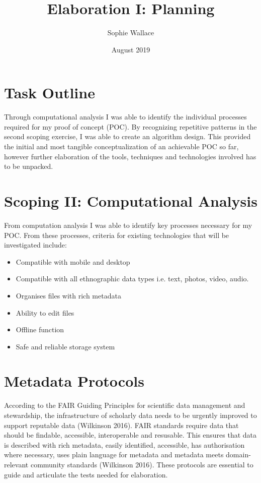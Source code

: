 \documentclass{article}
\title{Elaboration I: Planning}
\author{Sophie Wallace }
\date{August 2019}
\begin{document}
\maketitle

\section{Task Outline}
Through computational analysis I was able to identify the individual processes required for my proof of concept (POC). By recognizing repetitive patterns in the second scoping exercise, I was able to create an algorithm design. This provided the initial and most tangible conceptualization of an achievable POC so far, however further elaboration of the tools, techniques and technologies involved has to be unpacked.

\section{Scoping II: Computational Analysis}
From computation analysis I was able to identify key processes necessary for my POC. From these processes, criteria for existing technologies that will be investigated include:

\begin{itemize}
\item Compatible with mobile and desktop
\item Compatible with all ethnographic data types i.e. text, photos, video, audio.
\item Organises files with rich metadata
\item Ability to edit files
\item Offline function 
\item Safe and reliable storage system
\end{itemize}


\section{Metadata Protocols}
According to the FAIR Guiding Principles for scientific data management and stewardship, the infrastructure of scholarly data needs to be urgently improved to support reputable data (Wilkinson 2016). FAIR standards require data that should be findable, accessible, interoperable and resusable. This ensures that data is described with rich metadata, easily identified, accessible, has authorisation where necessary, uses plain language for metadata and metadata meets domain-relevant community standards (Wilkinson 2016). These protocols are essential to guide and articulate the tests needed for elaboration. 
\end{document}
